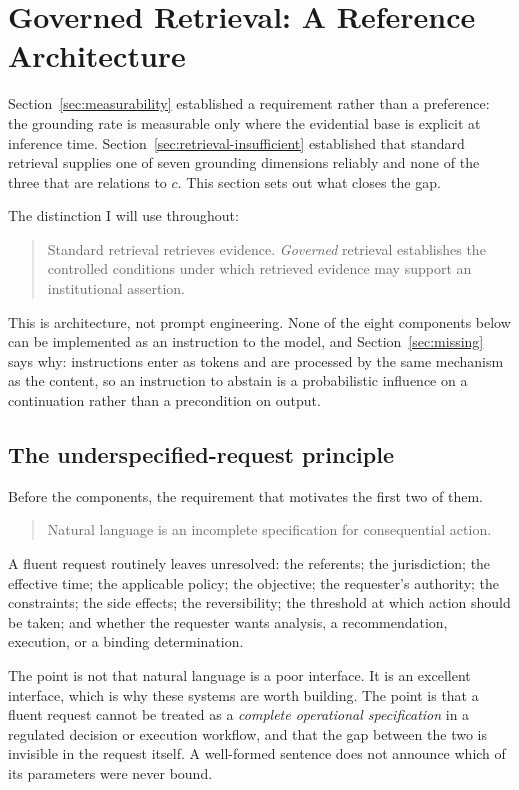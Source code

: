\section{Governed Retrieval: A Reference Architecture}
\label{sec:governed-rag}

Section~\ref{sec:measurability} established a requirement rather than a preference:
the grounding rate is measurable only where the evidential base is explicit at
inference time. Section~\ref{sec:retrieval-insufficient} established that standard
retrieval supplies one of seven grounding dimensions reliably and none of the three
that are relations to $c$. This section sets out what closes the gap.

The distinction I will use throughout:

\begin{quote}
Standard retrieval retrieves evidence. \emph{Governed} retrieval establishes the
controlled conditions under which retrieved evidence may support an institutional
assertion.
\end{quote}

This is architecture, not prompt engineering. None of the eight components below can
be implemented as an instruction to the model, and Section~\ref{sec:missing} says
why: instructions enter as tokens and are processed by the same mechanism as the
content, so an instruction to abstain is a probabilistic influence on a
continuation rather than a precondition on output.

\subsection{The underspecified-request principle}
\label{sec:holodeck}

Before the components, the requirement that motivates the first two of them.

\begin{quote}
Natural language is an incomplete specification for consequential action.
\end{quote}

A fluent request routinely leaves unresolved: the referents; the jurisdiction; the
effective time; the applicable policy; the objective; the requester's authority; the
constraints; the side effects; the reversibility; the threshold at which action
should be taken; and whether the requester wants analysis, a recommendation,
execution, or a binding determination.

The point is not that natural language is a poor interface. It is an excellent
interface, which is why these systems are worth building. The point is that a
fluent request cannot be treated as a \emph{complete operational specification} in a
regulated decision or execution workflow, and that the gap between the two is
invisible in the request itself. A well-formed sentence does not announce which of
its parameters were never bound.

